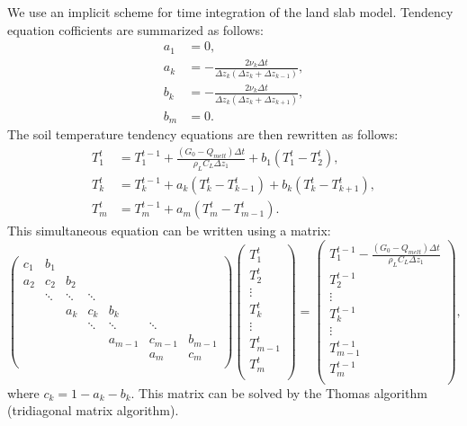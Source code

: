We use an implicit scheme for time integration of the land slab model.
Tendency equation cofficients are summarized as follows:
\begin{align}
  a_{1} &= 0, \\
  a_{k} &= - \frac{2\nu_{k}\Delta t}{\Delta z_{k}(\Delta z_{k}+\Delta z_{k-1})}, \\
  b_{k} &= - \frac{2\nu_{k}\Delta t}{\Delta z_{k}(\Delta z_{k}+\Delta z_{k+1})}, \\
  b_{m} &= 0.
\end{align}
The soil temperature tendency equations are then rewritten as follows:
\begin{align}
  T_{1}^{t} &= T_{1}^{t-1} + \frac{(G_{0} - Q_{melt})\Delta t}{\rho_{L}C_{L}\Delta z_{1}} + b_{1} (T_{1}^{t}-T_{2}^{t}), \\
  T_{k}^{t} &= T_{k}^{t-1} + a_{k} (T_{k}^{t}-T_{k-1}^{t}) + b_{k} (T_{k}^{t}-T_{k+1}^{t}), \\
  T_{m}^{t} &= T_{m}^{t-1} + a_{m} (T_{m}^{t}-T_{m-1}^{t}).
\end{align}
This simultaneous equation can be written using a matrix:
\begin{equation}
\begin{pmatrix}
  c_{1}  & b_{1}  &        &        &         &         &         \\
  a_{2}  & c_{2}  & b_{2}  &        &         &         &         \\
         & \ddots & \ddots & \ddots &         &         &         \\
         &        & a_{k}  & c_{k}  & b_{k}   &         &         \\
         &        &        & \ddots & \ddots  & \ddots  &         \\
         &        &        &        & a_{m-1} & c_{m-1} & b_{m-1} \\
         &        &        &        &         & a_{m}   & c_{m}   \\
\end{pmatrix}
\begin{pmatrix}
  T_{1}^{t}   \\
  T_{2}^{t}   \\
  \vdots      \\
  T_{k}^{t}   \\
  \vdots      \\
  T_{m-1}^{t} \\
  T_{m}^{t}   \\
\end{pmatrix}
=
\begin{pmatrix}
  T_{1}^{t-1} - \frac{(G_{0} - Q_{melt})\Delta t}{\rho_{L}C_{L}\Delta z_{1}} \\
  T_{2}^{t-1}   \\
  \vdots        \\
  T_{k}^{t-1}   \\
  \vdots        \\
  T_{m-1}^{t-1} \\
  T_{m}^{t-1}   \\
\end{pmatrix}
,
\end{equation}
where $c_{k} = 1 - a_{k} - b_{k}$.
This matrix can be solved by the Thomas algorithm (tridiagonal matrix algorithm).

